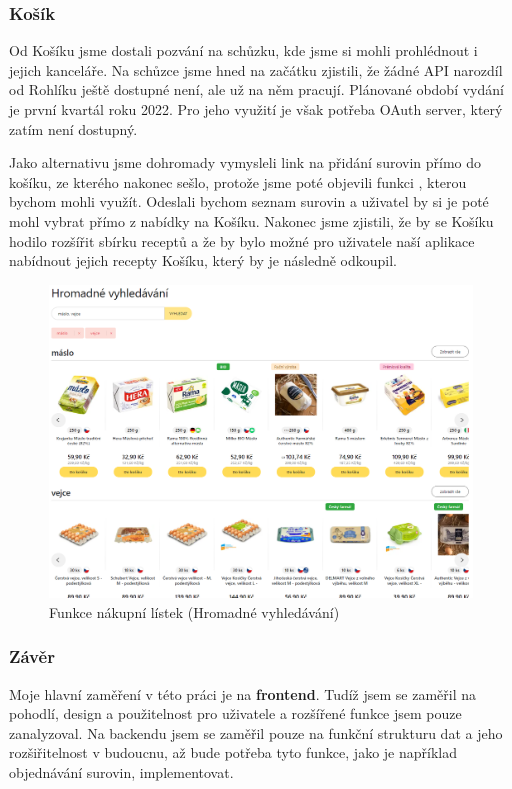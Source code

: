 \subsubsection{Košík}
Od Košíku jsme dostali pozvání na schůzku, kde jsme si mohli prohlédnout i jejich kanceláře. Na schůzce jsme hned na začátku
zjistili, že žádné API narozdíl od Rohlíku ještě dostupné není, ale už na něm pracují. Plánované období vydání je
první kvartál roku 2022. Pro jeho využití je však potřeba OAuth server, který zatím není dostupný.

Jako alternativu jsme dohromady vymysleli link na přidání surovin přímo do košíku, ze kterého nakonec sešlo, protože jsme
poté objevili funkci , kterou bychom mohli využít. Odeslali bychom seznam surovin a uživatel by si je poté
mohl vybrat přímo z nabídky na Košíku. Nakonec jsme zjistili, že by se Košíku hodilo rozšířit sbírku receptů a že by bylo možné
pro uživatele naší aplikace nabídnout jejich recepty Košíku, který by je následně odkoupil.

\begin{figure}[H]
    \includegraphics[width=\textwidth]{images/kosik-nakupni-listek}
    \caption{Funkce nákupní lístek (Hromadné vyhledávání)} \label{picture:kosik:nakupni-listek}
\end{figure}

\subsubsection{Závěr}
Moje hlavní zaměření v této práci je na \textbf{frontend}. Tudíž jsem se zaměřil na pohodlí, design a použitelnost pro uživatele
a rozšířené funkce jsem pouze zanalyzoval. Na backendu jsem se zaměřil pouze na funkční strukturu dat a jeho rozšiřitelnost
v budoucnu, až bude potřeba tyto funkce, jako je například objednávání surovin, implementovat.

